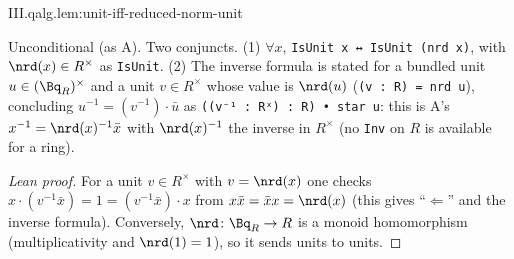 \begin{lemma}[units]
\end{lemma}
\begin{tfformal}{III.qalg.lem:unit-iff-reduced-norm-unit}
\begin{tffidelity}
Unconditional (as A). Two conjuncts. (1) $\forall x$, \texttt{IsUnit x ↔ IsUnit (nrd x)}, with $\nrd(x)\in R^\times$ as \texttt{IsUnit}. (2) The inverse formula is stated for a bundled unit $u\in(\Bq_R)^\times$ and a unit $v\in R^\times$ whose value is $\nrd(u)$ (\texttt{(v : R) = nrd u}), concluding $u^{-1}=(v^{-1})\cdot\bar u$ as \texttt{((v⁻¹ : Rˣ) : R) • star u}: this is A's $x^{-1}=\nrd(x)^{-1}\bar x$ with $\nrd(x)^{-1}$ the inverse in $R^\times$ (no \texttt{Inv} on $R$ is available for a ring).
\end{tffidelity}
\end{tfformal}
\begin{proof}[Lean proof]
For a unit $v\in R^\times$ with $v=\nrd(x)$ one checks $x\cdot(v^{-1}\bar x)=1=(v^{-1}\bar x)\cdot x$ from $x\bar x=\bar x x=\nrd(x)$ (this gives ``$\Leftarrow$'' and the inverse formula). Conversely, $\nrd\colon\Bq_R\to R$ is a monoid homomorphism (multiplicativity and $\nrd(1)=1$), so it sends units to units.
\end{proof}

